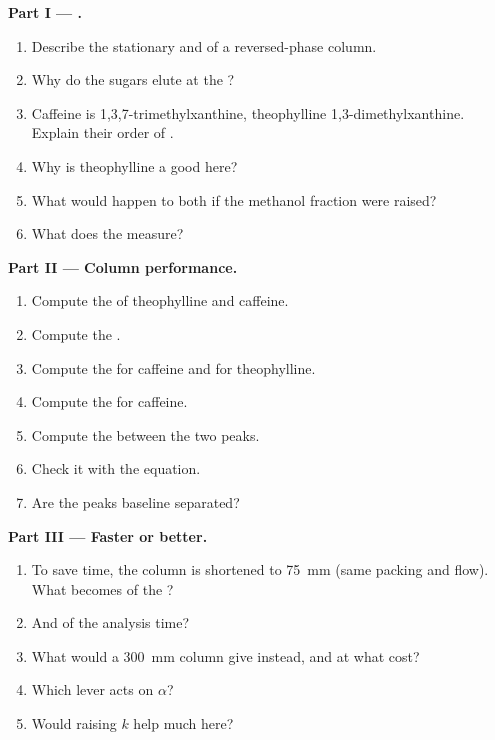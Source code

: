 \begin{problem}
\medskip
\noindent\textbf{Part I --- .}
\begin{enumerate}
  \item Describe the stationary and  of a reversed-phase column.
  \item Why do the sugars elute at the ?
  \item Caffeine is 1,3,7-trimethylxanthine, theophylline 1,3-dimethylxanthine. Explain their order of
        .
  \item Why is theophylline a good  here?
  \item What would happen to both  if the methanol fraction were raised?
  \item What does the  measure?
\end{enumerate}

\medskip
\noindent\textbf{Part II --- Column performance.}
\begin{enumerate}[resume]
  \item Compute the  of theophylline and caffeine.
  \item Compute the .
  \item Compute the  for caffeine and for theophylline.
  \item Compute the  for caffeine.
  \item Compute the  between the two peaks.
  \item Check it with the  equation.
  \item Are the peaks baseline separated?
\end{enumerate}

\medskip
\noindent\textbf{Part III --- Faster or better.}
\begin{enumerate}[resume]
  \item To save time, the column is shortened to \qty{75}{mm} (same packing and flow). What becomes of
        the ?
  \item And of the analysis time?
  \item What would a \qty{300}{mm} column give instead, and at what cost?
  \item Which lever acts on $\alpha$?
  \item Would raising $k$ help much here?
\end{enumerate}


\end{problem}
